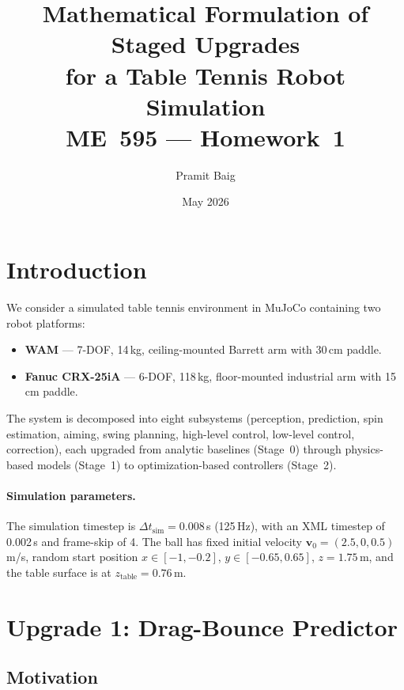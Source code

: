 \documentclass[11pt,letterpaper]{article}
\title{\textbf{Mathematical Formulation of Staged Upgrades\\for a Table Tennis Robot Simulation}\\[6pt]
\large ME~595 --- Homework~1}
\author{Pramit Baig}
\date{May 2026}
\newcommand{\vv}[1]{\mathbf{#1}}
\begin{document}
\maketitle

\section{Introduction}

We consider a simulated table tennis environment in MuJoCo containing two robot platforms:
\begin{itemize}[nosep]
    \item \textbf{WAM} --- 7-DOF, 14\,kg, ceiling-mounted Barrett arm with 30\,cm paddle.
    \item \textbf{Fanuc CRX-25iA} --- 6-DOF, 118\,kg, floor-mounted industrial arm with 15\,cm paddle.
\end{itemize}
The system is decomposed into eight subsystems (perception, prediction, spin estimation, aiming, swing planning, high-level control, low-level control, correction), each upgraded from analytic baselines (Stage~0) through physics-based models (Stage~1) to optimization-based controllers (Stage~2).

\paragraph{Simulation parameters.}
The simulation timestep is $\Delta t_{\text{sim}} = 0.008$\,s (125\,Hz), with an XML timestep of 0.002\,s and frame-skip of 4.
The ball has fixed initial velocity $\vv{v}_0 = (2.5, 0, 0.5)$\,m/s, random start position $x \in [-1, -0.2]$, $y \in [-0.65, 0.65]$, $z = 1.75$\,m, and the table surface is at $z_{\text{table}} = 0.76$\,m.

\section{Upgrade 1: Drag-Bounce Predictor}
\label{sec:predictor}

\subsection{Motivation}
\end{document}
